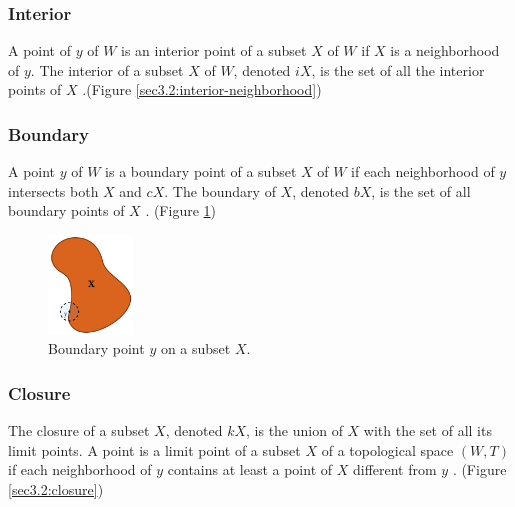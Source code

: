 \documentclass[a4paper,11pt,oneside]{article}
\begin{document}
\subsubsection{Interior}
     
\begin{definition}
	A point of $y$ of $W$ is an interior point of a subset $X$ of $W$ if $X$ is a neighborhood of $y$. The interior of a subset $X$ of $W$, denoted $iX$, is the set of all the interior points of $X$ \cite{Requicha1978MathematicalFO}.(Figure \ref{sec3.2:interior-neighborhood})
\end{definition}
    
\subsubsection{Boundary}
    
\begin{definition}
	A point $y$ of $W$ is a boundary point of a subset $X$ of $W$ if each neighborhood of $y$ intersects both $X$ and $cX$. The boundary of $X$, denoted $bX$, is the set of all boundary points of $X$ \cite{Requicha1978MathematicalFO}. (Figure \ref{sec3.2:boundary})
\end{definition}
    
\begin{figure}[ht]
	\begin{center}
		\includegraphics[width=0.2\textwidth]{section3/3.2/boundary.png}
	\end{center}
	\caption{Boundary point $y$ on a subset $X$.}
	\label{sec3.2:boundary}
\end{figure}
    
\subsubsection{Closure}
    
\begin{definition}
	The closure of a subset $X$, denoted $kX$, is the union of $X$ with the set of all its limit points. A point is a limit point of a subset $X$ of a topological space $(W, T)$ if each neighborhood of $y$ contains at least a point of $X$ different from $y$ \cite{Requicha1978MathematicalFO}. (Figure \ref{sec3.2:closure})
\end{definition}
    
\end{document}
